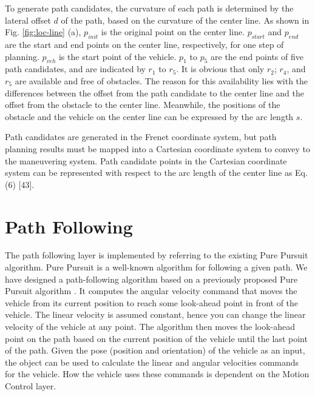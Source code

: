 To generate path candidates, the curvature of each path is determined by the lateral offset $d$ of the path, based on the curvature of the center line. As shown in Fig. \ref{fig:loc-line} (a), $p_{init}$ is the original point on the center line. $p_{start}$ and $p_{end}$ are the start and end points on the center line, respectively, for one step of planning. $p_{veh}$ is the start point of the vehicle. $p_1$ to $p_5$ are the end points of five path candidates, and are indicated by $r_1$ to $r_5$. It is obvious that only $r_2$; $r_4$, and $r_5$ are available and free of obstacles. The reason for this availability lies with the differences between the offset from the path candidate to the center line and the offset from the obstacle to the center line. Meanwhile, the positions of the obstacle and the vehicle on the center line can be expressed by the arc length $s$.

Path candidates are generated in the Frenet coordinate system, but path planning results must be mapped into a Cartesian coordinate system to convey to the maneuvering system. Path candidate points in the Cartesian coordinate system can be represented with respect to the arc length of the center line as Eq. (6) [43].

\section{Path Following}

The path following layer is implemented by referring to the existing Pure Pursuit algorithm. Pure Pursuit is a well-known algorithm for following a given path. We have designed a path-following algorithm based on a previously proposed Pure Pursuit algorithm \cite{PurePursuit1992}. It computes the angular velocity command that moves the vehicle from its current position to reach some look-ahead point in front of the vehicle. The linear velocity is assumed constant, hence you can change the linear velocity of the vehicle at any point. The algorithm then moves the look-ahead point on the path based on the current position of the vehicle until the last point of the path. Given the pose (position and orientation) of the vehicle as an input, the object can be used to calculate the linear and angular velocities commands for the vehicle. How the vehicle uses these commands is dependent on the Motion Control layer.

